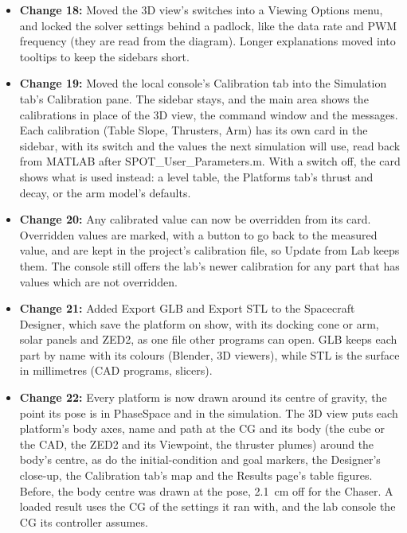 \documentclass[11pt]{article}
\begin{document}
\begin{itemize}[label={\textcolor{primaryColor}{\textbullet}}]
    \item \textbf{Change 18:} Moved the 3D view's switches into a Viewing Options menu, and locked the solver settings behind a padlock, like the data rate and PWM frequency (they are read from the diagram). Longer explanations moved into tooltips to keep the sidebars short.
    \item \textbf{Change 19:} Moved the local console's Calibration tab into the Simulation tab's Calibration pane. The sidebar stays, and the main area shows the calibrations in place of the 3D view, the command window and the messages. Each calibration (Table Slope, Thrusters, Arm) has its own card in the sidebar, with its switch and the values the next simulation will use, read back from MATLAB after SPOT\_User\_Parameters.m. With a switch off, the card shows what is used instead: a level table, the Platforms tab's thrust and decay, or the arm model's defaults.
    \item \textbf{Change 20:} Any calibrated value can now be overridden from its card. Overridden values are marked, with a button to go back to the measured value, and are kept in the project's calibration file, so Update from Lab keeps them. The console still offers the lab's newer calibration for any part that has values which are not overridden.
    \item \textbf{Change 21:} Added Export GLB and Export STL to the Spacecraft Designer, which save the platform on show, with its docking cone or arm, solar panels and ZED2, as one file other programs can open. GLB keeps each part by name with its colours (Blender, 3D viewers), while STL is the surface in millimetres (CAD programs, slicers).
    \item \textbf{Change 22:} Every platform is now drawn around its centre of gravity, the point its pose is in PhaseSpace and in the simulation. The 3D view puts each platform's body axes, name and path at the CG and its body (the cube or the CAD, the ZED2 and its Viewpoint, the thruster plumes) around the body's centre, as do the initial-condition and goal markers, the Designer's close-up, the Calibration tab's map and the Results page's table figures. Before, the body centre was drawn at the pose, 2.1~cm off for the Chaser. A loaded result uses the CG of the settings it ran with, and the lab console the CG its controller assumes.
\end{itemize}

\end{document}
